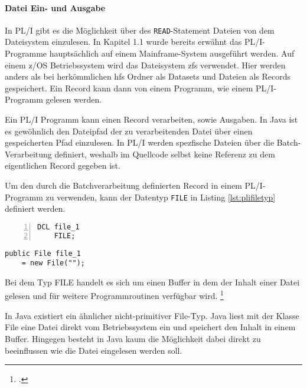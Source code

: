 \paragraph{Datei Ein- und Ausgabe}
In PL/I gibt es die Möglichkeit über des \verb+READ+-Statement Dateien von dem Dateisystem einzulesen.
In Kapitel 1.1 wurde bereits erwähnt das PL/I-Programme hauptsächlich auf einem Mainframe-System ausgeführt werden.
Auf einem z/OS Betriebssystem wird das Dateisystem \ac{zfs} verwendet.
Hier werden anders als bei herkömmlichen \ac{hfs} Ordner als Datasets und Dateien als Records gespeichert.
Ein Record kann dann von einem Programm, wie einem PL/I-Programm gelesen werden.

Ein PL/I Programm kann einen Record verarbeiten, sowie Ausgaben. In Java ist es gewöhnlich den Dateipfad der zu verarbeitenden Datei über einen gespeicherten Pfad einzulesen.
In PL/I werden spezfische Dateien über die Batch-Verarbeitung definiert, weshalb im Quellcode selbst keine Referenz zu dem eigentlichen Record gegeben ist.

Um den durch die Batchverarbeitung definierten Record in einem PL/I-Programm zu verwenden, kann der Datentyp \verb+FILE+ in Listing \ref{lst:plifiletyp} definiert werden.

\begin{minipage}[b]{0.48\linewidth}
	\centering
	\lstset{language=PL/I,label=SliceExaple}
	\begin{lstlisting}[frame=single, numbers=left, mathescape,%
		caption={Dateityp}, label={lst:plifiletyp}]
	DCL file_1 
	FILE;
	\end{lstlisting}
\end{minipage}
\hspace{0.5cm}
\begin{minipage}[b]{0.48\linewidth}
	\centering
	\lstset{language=Java,label=SliceExaple}
	\begin{lstlisting}[frame=single, mathescape,%
		title={" "}]
	public File file_1
	= new File("");
	\end{lstlisting}
\end{minipage}  

Bei dem Typ FILE handelt es sich um einen Buffer in dem der Inhalt einer Datei gelesen und für weitere Programmroutinen verfügbar wird. \footcite[Vgl. ][ S.305ff. ]{pliref}

In Java existiert ein ähnlicher nicht-primitiver File-Typ.
Java liest mit der Klasse File eine Datei direkt vom Betriebssystem ein und speichert den Inhalt in einem Buffer. 
Hingegen besteht in Java kaum die Möglichkeit dabei direkt zu beeinflussen wie die Datei eingelesen werden soll. 


